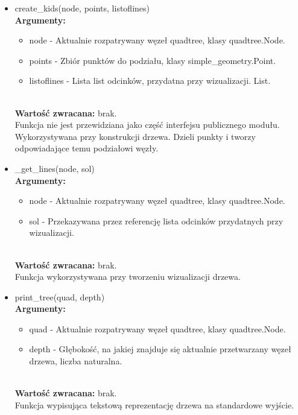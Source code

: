 \documentclass{article}
\begin{document}
            \begin{itemize}
                \item create\_kids(node, points, listoflines)\\
                    \textbf{Argumenty:} \begin{itemize}
                        \item node - Aktualnie rozpatrywany węzeł quadtree, klasy quadtree.Node.
                        \item points - Zbiór punktów do podziału, klasy simple\_geometry.Point.
                        \item listoflines - Lista list odcinków, przydatna przy wizualizacji. List.
                    \end{itemize}\\
                    \textbf{Wartość zwracana:} brak.\\
                    Funkcja nie jest przewidziana jako część interfejsu publicznego modułu.\\
                    Wykorzystywana przy konstrukcji drzewa. Dzieli punkty i tworzy odpowiadające temu podziałowi węzły. 
                
                \item \_get\_lines(node, sol)\\
                    \textbf{Argumenty:} \begin{itemize}
                        \item node - Aktualnie rozpatrywany węzeł quadtree, klasy quadtree.Node.
                        \item sol - Przekazywana przez referencję lista odcinków przydatnych przy wizualizacji.
                    \end{itemize}\\
                    \textbf{Wartość zwracana:} brak.\\
                    Funkcja wykorzystywana przy tworzeniu wizualizacji drzewa.
                
                \item print\_tree(quad, depth)\\
                    \textbf{Argumenty:} \begin{itemize}
                            \item quad - Aktualnie rozpatrywany węzeł quadtree, klasy quadtree.Node.
                            \item depth - Głębokość, na jakiej znajduje się aktualnie przetwarzany węzeł drzewa, liczba naturalna.
                        \end{itemize}\\
                        \textbf{Wartość zwracana:} brak.\\
                    Funkcja wypisująca tekstową reprezentację drzewa na standardowe wyjście.
            \end{itemize}
            
\end{document}

